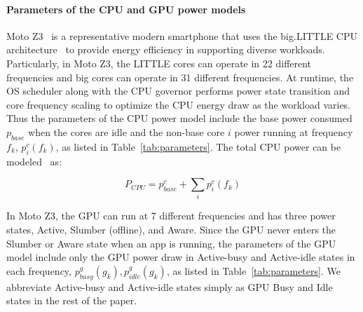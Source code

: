 
\paragraph{Parameters of the CPU and GPU power models}
Moto Z3~\cite{motoz3} is a representative modern smartphone
that uses the big.LITTLE CPU architecture~\cite{biglittlearch} to
provide energy efficiency in supporting diverse workloads.
Particularly, in Moto Z3, the LITTLE cores can operate in 22 different frequencies 
and big cores can operate in 31 different frequencies.
At runtime, the OS scheduler along with the CPU governor performs power state transition and core frequency scaling to optimize the CPU energy draw as the workload varies.
Thus the parameters of the CPU power model include
the base power consumed $p_{base}$ when the cores are idle and
the non-base core $i$ power running at frequency $f_k$, $p^c_i(f_k)$, as listed in Table~\ref{tab:parameters}.
The total CPU power can be modeled~\cite{multicoremodel:2015} as:
{
\begin{equation}
    P_{CPU} = p^c_{base} + \sum_{i} p^c_i(f_k)
\end{equation}

}

In Moto Z3, the GPU can run at 7 different frequencies and has three power states,
Active, Slumber (offline), and Aware.
Since the GPU never enters the Slumber or Aware state when an app is running, 
the parameters of the GPU model include only the GPU power draw in Active-busy and Active-idle states in each frequency, $p^g_{busy}(g_k), p^g_{idle}(g_k)$, as listed in Table~\ref{tab:parameters}.
We abbreviate Active-busy and Active-idle states simply
as GPU Busy and Idle states in the rest of the paper.


